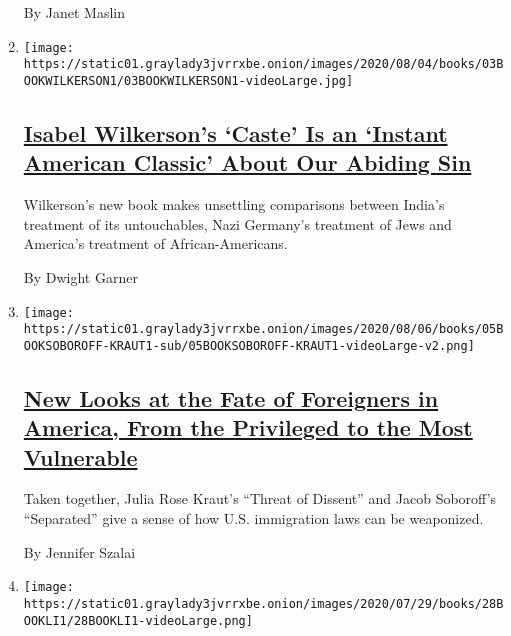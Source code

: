 \begin{enumerate}
  By Janet Maslin
\item
  \texttt{[image: https://static01.graylady3jvrrxbe.onion/images/2020/08/04/books/03BOOKWILKERSON1/03BOOKWILKERSON1-videoLarge.jpg]}

  \hypertarget{isabel-wilkersons-caste-is-an-instant-american-classic-about-our-abiding-sin}{%
  \subsection{\texorpdfstring{\href{/2020/07/31/books/review-caste-isabel-wilkerson-origins-of-our-discontents.html}{Isabel
  Wilkerson's `Caste' Is an `Instant American Classic' About Our Abiding
  Sin}}{Isabel Wilkerson's `Caste' Is an `Instant American Classic' About Our Abiding Sin}}\label{isabel-wilkersons-caste-is-an-instant-american-classic-about-our-abiding-sin}}

  Wilkerson's new book makes unsettling comparisons between India's
  treatment of its untouchables, Nazi Germany's treatment of Jews and
  America's treatment of African-Americans.

  By Dwight Garner
\item
  \texttt{[image: https://static01.graylady3jvrrxbe.onion/images/2020/08/06/books/05BOOKSOBOROFF-KRAUT1-sub/05BOOKSOBOROFF-KRAUT1-videoLarge-v2.png]}

  \hypertarget{new-looks-at-the-fate-of-foreigners-in-america-from-the-privileged-to-the-most-vulnerable}{%
  \subsection{\texorpdfstring{\href{/2020/07/30/books/review-threat-dissent-julia-rose-kraut-separated-jacob-soboroff.html}{New
  Looks at the Fate of Foreigners in America, From the Privileged to the
  Most
  Vulnerable}}{New Looks at the Fate of Foreigners in America, From the Privileged to the Most Vulnerable}}\label{new-looks-at-the-fate-of-foreigners-in-america-from-the-privileged-to-the-most-vulnerable}}

  Taken together, Julia Rose Kraut's ``Threat of Dissent'' and Jacob
  Soboroff's ``Separated'' give a sense of how U.S. immigration laws can
  be weaponized.

  By Jennifer Szalai
\item
  \texttt{[image: https://static01.graylady3jvrrxbe.onion/images/2020/07/29/books/28BOOKLI1/28BOOKLI1-videoLarge.png]}

  \hypertarget{in-yiyun-lis-latest-a-grieving-mother-desperately-clings-to-memory}{%
}
\end{enumerate}

